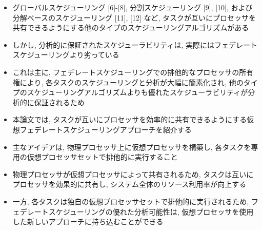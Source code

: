\begin{frame}{}
    \begin{itemize}
        \item グローバルスケジューリング [6]-[8], 分割スケジューリング [9], [10], および分解ベースのスケジューリング [11], [12] など, タスクが互いにプロセッサを共有できるようにする他のタイプのスケジューリングアルゴリズムがある
        \item しかし, 分析的に保証されたスケジューラビリティは, 実際にはフェデレートスケジューリングより劣っている
        \item これは主に, フェデレートスケジューリングでの排他的なプロセッサの所有権により, 各タスクのスケジューリングと分析が大幅に簡素化され, 他のタイプのスケジューリングアルゴリズムよりも優れたスケジューラビリティが分析的に保証されるため
    \end{itemize}
\end{frame}

\begin{frame}{}
    \begin{itemize}
        \item 本論文では, タスクが互いにプロセッサを効率的に共有できるようにする仮想フェデレートスケジューリングアプローチを紹介する
        \item 主なアイデアは, 物理プロセッサ上に仮想プロセッサを構築し, 各タスクを専用の仮想プロセッサセットで排他的に実行すること
        \item 物理プロセッサが仮想プロセッサによって共有されるため, タスクは互いにプロセッサを効果的に共有し, システム全体のリソース利用率が向上する
        \item 一方, 各タスクは独自の仮想プロセッサセットで排他的に実行されるため, フェデレートスケジューリングの優れた分析可能性は, 仮想プロセッサを使用した新しいアプローチに持ち込むことができる
    \end{itemize}
\end{frame}
